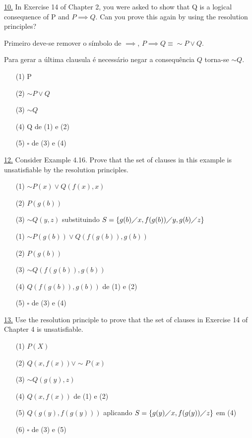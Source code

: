 \underline{10.} In Exercise 14 of Chapter 2, you were asked to show that Q is a logical consequence of P and $ P \implies Q $. Can you prove this again by using the resolution principles?

Primeiro deve-se remover o símbolo de $\implies$, $ P \implies Q \equiv \sim P \vee Q $.

Para gerar a última clausula é necessário negar a consequência $ Q $ torna-se $ \sim Q $.

\begin{itemize}
 \item[(1)] P
 \item[(2)] $ \sim P \vee Q $
 \item[(3)] $ \sim Q $
 \item[(4)] Q de (1) e (2)
 \item[(5)] $ \square $ de (3) e (4)
\end{itemize}

\underline{12.} Consider Example 4.16. Prove that the set of clauses in this example is unsatisfiable by the resolution principles.

\begin{itemize}
 \item[(1)] $ \sim P(x) \vee Q(f(x),x) $
 \item[(2)] $ P(g(b)) $
 \item[(3)] $ \sim Q(y,z) $ \newline
substituindo $ S = \{ g(b) \diagup x, f(g(b)) \diagup y, g(b) \diagup z \} $
 \item[(1)] $ \sim P(g(b)) \vee Q(f(g(b)),g(b)) $
 \item[(2)] $ P(g(b)) $
 \item[(3)] $ \sim Q(f(g(b)),g(b)) $
 \item[(4)] $ Q(f(g(b)),g(b)) $ de (1) e (2)
 \item[(5)] $ \square $ de (3) e (4)
\end{itemize}

\underline{13.} Use the resolution principle to prove that the set of clauses in Exercise 14 of Chapter 4 is unsatisfiable.

\begin{itemize}
 \item[(1)] $ P(X) $
 \item[(2)] $ Q(x,f(x)) \vee \sim P(x) $
 \item[(3)] $ \sim Q(g(y),z) $
 \item[(4)] $ Q(x, f(x)) $ de (1) e (2)
 \item[(5)] $ Q(g(y), f(g(y))) $ aplicando $S=\{g(y)\diagup x , f(g(y)) \diagup z \} $ em (4)
 \item[(6)] $ \square $ de (3) e (5)
\end{itemize}

